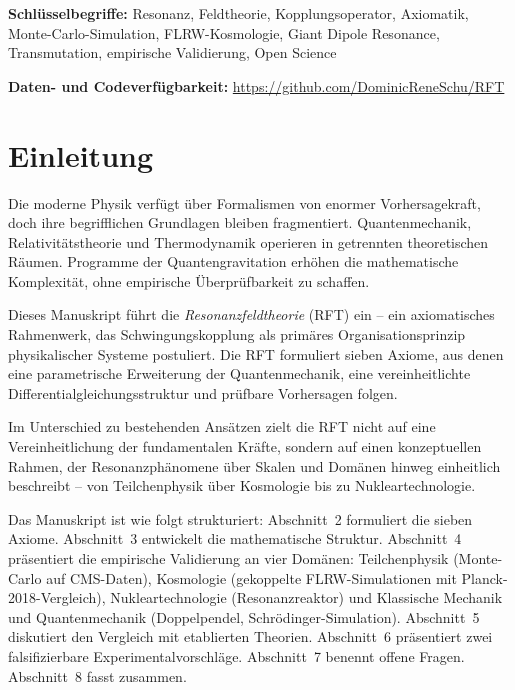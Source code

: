 \documentclass[12pt]{iopart}
\begin{document}
	\noindent\textbf{Schl\"usselbegriffe:} Resonanz, Feldtheorie,
	Kopplungsoperator, Axiomatik, Monte-Carlo-Simulation,
	FLRW-Kosmologie, Giant Dipole Resonance, Transmutation,
	empirische Validierung, Open Science
	
	\medskip
	
	\noindent\textbf{Daten- und Codeverf\"ugbarkeit:}
	\url{https://github.com/DominicReneSchu/RFT}
	
	
	\section{Einleitung}
	
	Die moderne Physik verf\"ugt \"uber Formalismen von enormer
	Vorhersagekraft, doch ihre begrifflichen Grundlagen bleiben
	fragmentiert. Quantenmechanik, Relativit\"atstheorie und
	Thermodynamik operieren in getrennten theoretischen R\"aumen.
	Programme der Quantengravitation erh\"ohen die mathematische
	Komplexit\"at, ohne empirische \"Uberpr\"ufbarkeit zu schaffen.
	
	Dieses Manuskript f\"uhrt die \textit{Resonanzfeldtheorie}
	(RFT) ein -- ein axiomatisches Rahmenwerk, das
	Schwingungskopplung als prim\"ares Organisationsprinzip
	physikalischer Systeme postuliert. Die RFT formuliert sieben
	Axiome, aus denen eine parametrische Erweiterung der
	Quantenmechanik, eine vereinheitlichte
	Differentialgleichungsstruktur und pr\"ufbare Vorhersagen
	folgen.
	
	Im Unterschied zu bestehenden Ans\"atzen zielt die RFT nicht
	auf eine Vereinheitlichung der fundamentalen Kr\"afte, sondern
	auf einen konzeptuellen Rahmen, der Resonanzph\"anomene
	\"uber Skalen und Dom\"anen hinweg einheitlich beschreibt --
	von Teilchenphysik \"uber Kosmologie bis zu Nukleartechnologie.
	
	Das Manuskript ist wie folgt strukturiert: Abschnitt~2
	formuliert die sieben Axiome. Abschnitt~3 entwickelt die
	mathematische Struktur. Abschnitt~4 pr\"asentiert die
	empirische Validierung an vier Dom\"anen: Teilchenphysik
	(Monte-Carlo auf CMS-Daten), Kosmologie (gekoppelte
	FLRW-Simulationen mit Planck-2018-Vergleich),
	Nukleartechnologie (Resonanzreaktor) und
	Klassische Mechanik und Quantenmechanik
	(Doppelpendel, Schr\"odinger-Simulation). Abschnitt~5 diskutiert den
	Vergleich mit etablierten Theorien. Abschnitt~6
	pr\"asentiert zwei falsifizierbare Experimentalvorschl\"age.
	Abschnitt~7 benennt offene Fragen. Abschnitt~8 fasst
	zusammen.
	
\end{document}
